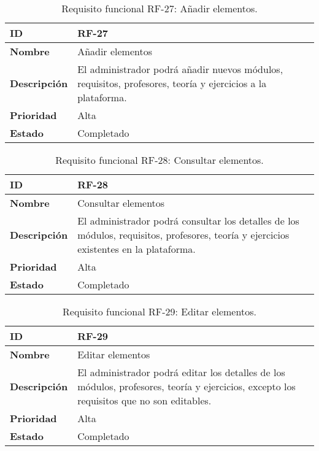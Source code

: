 \begin{table}[H]
    \centering
    \begin{tabular}{|l|p{9.5cm}|}
        \hline
        \textbf{ID} & RF-27 \\
        \hline
        \textbf{Nombre} & Añadir elementos \\
        \hline
        \textbf{Descripción} & El administrador podrá añadir nuevos módulos, requisitos, profesores, teoría y ejercicios a la plataforma. \\
        \hline
        \textbf{Prioridad} & Alta \\
        \hline
        \textbf{Estado} & Completado \\
        \hline
    \end{tabular}
    \caption{Requisito funcional RF-27: Añadir elementos.}
    \label{table:req-RF00O}
\end{table}

\begin{table}[H]
    \centering
    \begin{tabular}{|l|p{9.5cm}|}
        \hline
        \textbf{ID} & RF-28 \\
        \hline
        \textbf{Nombre} & Consultar elementos \\
        \hline
        \textbf{Descripción} & El administrador podrá consultar los detalles de los módulos, requisitos, profesores, teoría y ejercicios existentes en la plataforma. \\
        \hline
        \textbf{Prioridad} & Alta \\
        \hline
        \textbf{Estado} & Completado \\
        \hline
    \end{tabular}
    \caption{Requisito funcional RF-28: Consultar elementos.}
    \label{table:req-RF00P}
\end{table}

\begin{table}[H]
    \centering
    \begin{tabular}{|l|p{9.5cm}|}
        \hline
        \textbf{ID} & RF-29 \\
        \hline
        \textbf{Nombre} & Editar elementos \\
        \hline
        \textbf{Descripción} & El administrador podrá editar los detalles de los módulos, profesores, teoría y ejercicios, excepto los requisitos que no son editables. \\
        \hline
        \textbf{Prioridad} & Alta \\
        \hline
        \textbf{Estado} & Completado \\
        \hline
    \end{tabular}
    \caption{Requisito funcional RF-29: Editar elementos.}
    \label{table:req-RF00Q}
\end{table}

